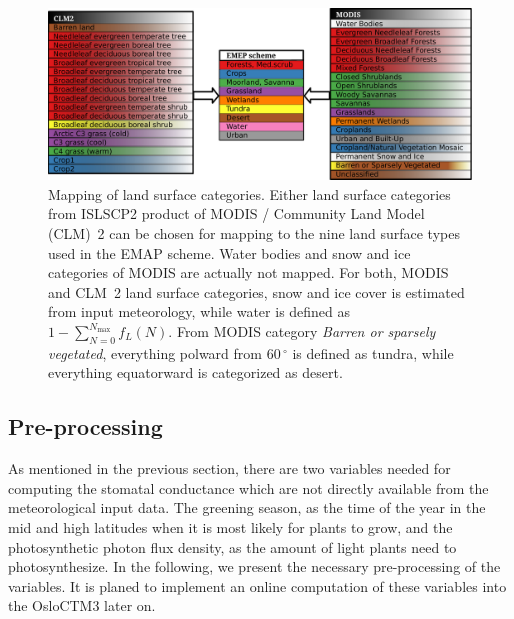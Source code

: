 \documentclass[gmd, manuscript]{copernicus}
\begin{document}
\begin{figure}[t]
  \includegraphics[width=12cm]{fig02}
  \caption{Mapping of land surface categories. Either land surface categories from ISLSCP2 product of MODIS /  Community Land Model (CLM)~2 can be chosen for mapping to the nine land surface types used in the EMAP scheme. Water bodies and snow and ice categories of MODIS are actually not mapped. For both, MODIS and CLM~2 land surface categories, snow and ice cover is estimated from input meteorology, while water is defined as $1-\sum_{N=0}^{N_\text{max}} f_L(N)$. From MODIS category \emph{Barren or sparsely vegetated}, everything polward from $60\,\unit{^\circ}$ is defined as tundra, while everything equatorward is categorized as desert.}
  \label{fig:pft_mapping}
\end{figure}
%
\subsection{Pre-processing}
\label{subsec:pre-pro}
As mentioned in the previous section, there are two variables needed for computing the stomatal conductance which are not directly available from the meteorological input data. The greening season, as the time of the year in the mid and high latitudes when it is most likely for plants to grow, and the photosynthetic photon flux density, as the amount of light plants need to photosynthesize. In the following, we present the necessary pre-processing of the variables. It is planed to implement an online computation of these variables into the OsloCTM3 later on.
\end{document}

